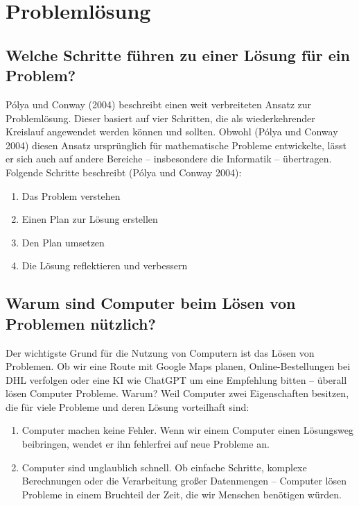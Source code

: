 \documentclass[
  letterpaper,
  DIV=11]{scrreprt}
\begin{document}
\chapter{Problemlösung}\label{sec-problem-solving}

\section{Welche Schritte führen zu einer Lösung für ein
Problem?}\label{welche-schritte-fuxfchren-zu-einer-luxf6sung-fuxfcr-ein-problem}

Pólya und Conway (2004) beschreibt einen weit verbreiteten Ansatz zur
Problemlösung. Dieser basiert auf vier Schritten, die als
wiederkehrender Kreislauf angewendet werden können und sollten. Obwohl
(Pólya und Conway 2004) diesen Ansatz ursprünglich für mathematische
Probleme entwickelte, lässt er sich auch auf andere Bereiche --
insbesondere die Informatik -- übertragen. Folgende Schritte beschreibt
(Pólya und Conway 2004):

\begin{enumerate}
\def\labelenumi{\arabic{enumi}.}
\item
  Das Problem verstehen
\item
  Einen Plan zur Lösung erstellen
\item
  Den Plan umsetzen
\item
  Die Lösung reflektieren und verbessern
\end{enumerate}

\section{Warum sind Computer beim Lösen von Problemen
nützlich?}\label{warum-sind-computer-beim-luxf6sen-von-problemen-nuxfctzlich}

Der wichtigste Grund für die Nutzung von Computern ist das Lösen von
Problemen. Ob wir eine Route mit Google Maps planen, Online-Bestellungen
bei DHL verfolgen oder eine KI wie ChatGPT um eine Empfehlung bitten --
überall lösen Computer Probleme. Warum? Weil Computer zwei Eigenschaften
besitzen, die für viele Probleme und deren Lösung vorteilhaft sind:

\begin{enumerate}
\def\labelenumi{\arabic{enumi}.}
\item
  Computer machen keine Fehler. Wenn wir einem Computer einen Lösungsweg
  beibringen, wendet er ihn fehlerfrei auf neue Probleme an.
\item
  Computer sind unglaublich schnell. Ob einfache Schritte, komplexe
  Berechnungen oder die Verarbeitung großer Datenmengen -- Computer
  lösen Probleme in einem Bruchteil der Zeit, die wir Menschen benötigen
  würden.
\end{enumerate}
\end{document}
